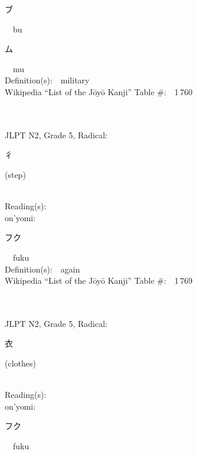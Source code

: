 \begin{multicols}{2}
{\hspace*{2em}}{\begin{CJK}{UTF8}{min} ブ \end{CJK}}\ \ bu\ \ \\
{\hspace*{2em}}{\begin{CJK}{UTF8}{min} ム \end{CJK}}\ \ mu\ \ \\
Definition(s):\ \ military \\
Wikipedia ``List of the J\=oy\=o Kanji'' Table \#:\ \ 1\,760 \\
\ \ \\
{\fontsize{34pt}{40pt}  }\ \ \\  %
{JLPT N2, Grade 5, Radical:\ \ {\begin{CJK}{UTF8}{min} 彳 \end{CJK}} (step) } \\
Reading(s):\ \ \\
{\hspace*{1em}}on'yomi:\ \ \\
{\hspace*{2em}}{\begin{CJK}{UTF8}{min} フク \end{CJK}}\ \ fuku\ \ \\
Definition(s):\ \ again \\
Wikipedia ``List of the J\=oy\=o Kanji'' Table \#:\ \ 1\,769 \\
\ \ \\
{\fontsize{34pt}{40pt}  }\ \ \\  %
{JLPT N2, Grade 5, Radical:\ \ {\begin{CJK}{UTF8}{min} 衣 \end{CJK}} (clothes) } \\
Reading(s):\ \ \\
{\hspace*{1em}}on'yomi:\ \ \\
{\hspace*{2em}}{\begin{CJK}{UTF8}{min} フク \end{CJK}}\ \ fuku\ \ \\

\end{multicols}
